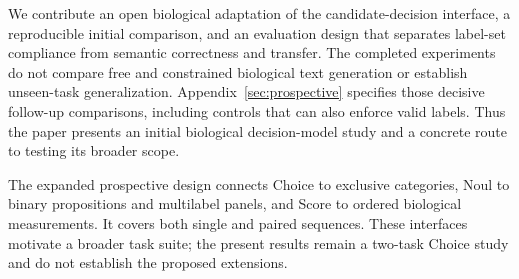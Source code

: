 We contribute an open biological adaptation of the candidate-decision interface, a reproducible initial comparison, and an evaluation design that separates label-set compliance from semantic correctness and transfer. The completed experiments do not compare free and constrained biological text generation or establish unseen-task generalization. Appendix~\ref{sec:prospective} specifies those decisive follow-up comparisons, including controls that can also enforce valid labels. Thus the paper presents an initial biological decision-model study and a concrete route to testing its broader scope.

The expanded prospective design connects Choice to exclusive categories, Noul to binary propositions and multilabel panels, and Score to ordered biological measurements. It covers both single and paired sequences. These interfaces motivate a broader task suite; the present results remain a two-task Choice study and do not establish the proposed extensions.
